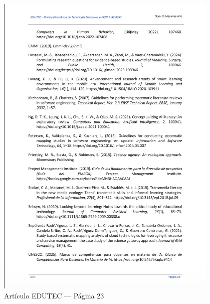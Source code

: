\begin{figure}[H]
    \centering
    \begin{tcolorbox}[
        colback=white,
        colframe=gray!50,
        boxrule=1pt,
        arc=2pt,
        boxsep=5pt,
        left=3pt,
        right=3pt,
        top=3pt,
        bottom=3pt,
        drop shadow
    ]
        \includegraphics[width=0.95\textwidth,keepaspectratio]{apendices/EDUTEC/23.png}
    \end{tcolorbox}
    \caption{Artículo EDUTEC --- Página 23}\label{fig:edutec-pagina-23}
\end{figure}
\FloatBarrier

